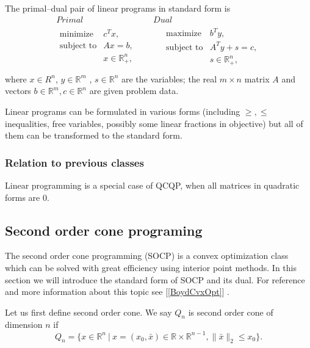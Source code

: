\documentclass[10pt,oneside]{book}
\theoremstyle{definition}
\begin{document}
\label{defLP}
The primal--dual pair of linear programs in standard form is 
\begin{equation}
\label{LP} 
\begin{array}{cc}
Primal & Dual \\
\begin{array}{ll}
\mbox{minimize} & c^Tx, \\
\mbox{subject to}& Ax = b ,  \\
& x \in \mathbb{R}^n_+,\\

\end{array} 
\ \ \ \ \ & \ \ \ \ \ 
\begin{array}{ll}
\mbox{maximize} & b^Ty, \\
\mbox{subject to}& A^Ty +s = c ,  \\
& s\in \mathbb{R}^n_+, \\
\end{array}
\end{array} 
\end{equation}
where $x\in R^n$, $y\in \mathbb{R}^m$ , $s\in \mathbb{R}^n$ are the variables; the real $m\times n$ matrix $A$ and vectors $b \in \mathbb{R}^m, c\in \mathbb{R}^n$ are given problem data.

\bigskip

\rem Linear programs can be formulated in various forms (including $\geq , \leq$ inequalities, free variables, possibly some linear fractions in objective) but all of them can be transformed to the standard form.

\subsubsection{Relation to previous classes}
Linear programming is a special case of QCQP, when all matrices in quadratic forms are 0.


\subsection{Second order cone programing}
\label{SectionSOCP}


The second order cone programming (SOCP) is a convex optimization class which can be solved with great efficiency using interior point methods. 
In this section we will introduce the standard form of SOCP and its dual. For reference and more information about this topic see [\ref{BoydCvxOpt}] .


Let us first define second order cone.
\label{defSOC} We say $Q_n$ is second order cone of dimension $n$ if 
\begin{equation}
Q_n=\{x\in \mathbb{R}^n \ | \ x = (x_0,\bar{x}) \in \mathbb{R}\times\mathbb{R}^{n-1}, \|\bar{x}\|_2\leq x_0\}.
\end{equation}
\end{document}
